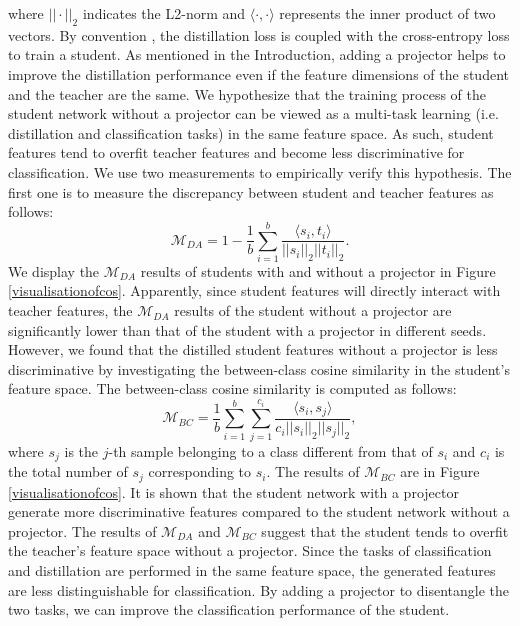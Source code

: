 \documentclass{article}
\begin{document}
where $||\cdot||_2$ indicates the L2-norm and $\langle \cdot,\cdot\rangle$ represents the inner product of two vectors. By convention \cite{kd,crd,srrl}, the distillation loss is coupled with the cross-entropy loss to train a student. As mentioned in the Introduction, adding a projector helps to improve the distillation performance even if the feature dimensions of the student and the teacher are the same. We hypothesize that the training process of the student network without a projector can be viewed as a multi-task learning (i.e. distillation and classification tasks) in the same feature space. As such, student features tend to overfit teacher features and become less discriminative for classification. We use two measurements to empirically verify this hypothesis. The first one is to measure the discrepancy between student and teacher features as follows: 
\begin{equation}
    \mathcal{M}_{DA} = 1- \frac{1}{b}\sum_{i=1}^b\frac{\langle s_i,t_i\rangle}{||s_i||_2||t_i||_2}.
\end{equation}
We display the $\mathcal{M}_{DA}$ results of students with and without a projector in Figure \ref{visualisationofcos}. Apparently, since student features will directly interact with teacher features, the $\mathcal{M}_{DA}$ results of the student without a projector are significantly lower than that of the student with a projector in different seeds. However, we found that the distilled student features without a projector is less discriminative by investigating the between-class cosine similarity in the student's feature space. The between-class cosine similarity is computed as follows:
\begin{equation}
    \mathcal{M}_{BC} = \frac{1}{b}\sum_{i=1}^b\sum_{j=1}^{c_i}\frac{\langle s_i,s_j\rangle}{c_i||s_i||_2||s_j||_2},
\end{equation}
where $s_j$ is the $j$-th sample belonging to a class different from that of $s_i$ and $c_i$ is the total number of $s_j$ corresponding to $s_i$. The results of $\mathcal{M}_{BC}$ are in Figure \ref{visualisationofcos}. It is shown that the student network with a projector generate more discriminative features compared to the student network without a projector. The results of $\mathcal{M}_{DA}$ and $\mathcal{M}_{BC}$ suggest that the student tends to overfit the teacher's feature space without a projector. Since the tasks of classification and distillation are performed in the same feature space, the generated features are less distinguishable for classification. By adding a projector to disentangle the two tasks, we can improve the classification performance of the student.
\end{document}
